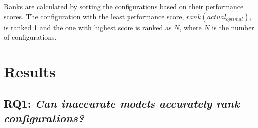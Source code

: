 \noindent Ranks are calculated by sorting the configurations based on their performance scores. The configuration with the least performance score, $\mathit{rank(actual_{optimal})}$, is ranked 1 and the one with highest  score is ranked as $N$, where $N$ is the number of configurations.


 




\section{Results}
\subsection{RQ1: \textit{Can  inaccurate    models accurately rank configurations?}}

